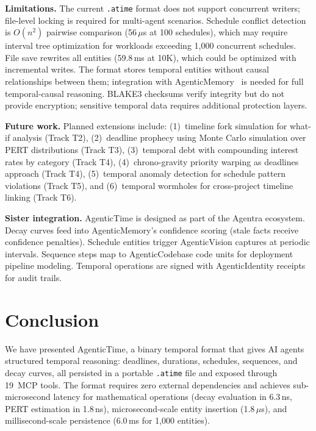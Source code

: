 \documentclass[10pt, twocolumn]{article}
\begin{document}
\textbf{Limitations.} The current \texttt{.atime} format does not support concurrent writers; file-level locking is required for multi-agent scenarios. Schedule conflict detection is $O(n^2)$ pairwise comparison (56\,$\mu$s at 100 schedules), which may require interval tree optimization for workloads exceeding 1{,}000 concurrent schedules. File save rewrites all entities (59.8\,ms at 10K), which could be optimized with incremental writes. The format stores temporal entities without causal relationships between them; integration with AgenticMemory~\cite{owolabi2026agenticmemory} is needed for full temporal-causal reasoning. BLAKE3 checksums verify integrity but do not provide encryption; sensitive temporal data requires additional protection layers.

\textbf{Future work.} Planned extensions include: (1)~timeline fork simulation for what-if analysis (Track T2), (2)~deadline prophecy using Monte Carlo simulation over PERT distributions (Track T3), (3)~temporal debt with compounding interest rates by category (Track T4), (4)~chrono-gravity priority warping as deadlines approach (Track T4), (5)~temporal anomaly detection for schedule pattern violations (Track T5), and (6)~temporal wormholes for cross-project timeline linking (Track T6).

\textbf{Sister integration.} AgenticTime is designed as part of the Agentra ecosystem. Decay curves feed into AgenticMemory's confidence scoring (stale facts receive confidence penalties). Schedule entities trigger AgenticVision captures at periodic intervals. Sequence steps map to AgenticCodebase code units for deployment pipeline modeling. Temporal operations are signed with AgenticIdentity receipts for audit trails.


\section{Conclusion}
\label{sec:conclusion}

We have presented AgenticTime, a binary temporal format that gives AI agents structured temporal reasoning: deadlines, durations, schedules, sequences, and decay curves, all persisted in a portable \texttt{.atime} file and exposed through 19~MCP tools. The format requires zero external dependencies and achieves sub-microsecond latency for mathematical operations (decay evaluation in 6.3\,ns, PERT estimation in 1.8\,ns), microsecond-scale entity insertion (1.8\,$\mu$s), and millisecond-scale persistence (6.0\,ms for 1{,}000 entities).
\end{document}
